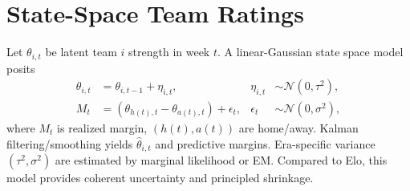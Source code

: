 

\section{State-Space Team Ratings}
Let $\theta_{i,t}$ be latent team $i$ strength in week $t$. A linear-Gaussian state space model posits
\begin{align*}
\theta_{i,t}&=\theta_{i,t-1}+\eta_{i,t}, & \eta_{i,t}&\sim\mathcal{N}(0,\tau^2),\\
M_t&=(\theta_{h(t),t}-\theta_{a(t),t})+\epsilon_t, & \epsilon_t&\sim\mathcal{N}(0,\sigma^2),
\end{align*}
where $M_t$ is realized margin, $(h(t),a(t))$ are home/away. Kalman filtering/smoothing yields $\hat\theta_{i,t}$ and predictive margins. Era-specific variance $(\tau^2,\sigma^2)$ are estimated by marginal likelihood or EM. Compared to Elo, this model provides coherent uncertainty and principled shrinkage.

